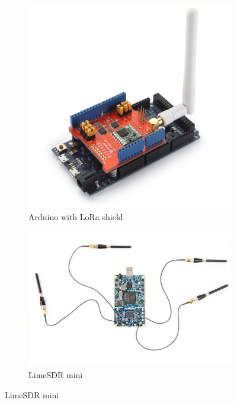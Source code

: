 \begin{figure}[H]
    \centering
    \begin{subfigure}[b]{0.25\textwidth}
     \includegraphics[width=1\textwidth]{figures/arduino.png}
     \caption{Arduino with LoRa shield}
     \label{fig:ard}
    \end{subfigure}%
    \hspace{2em}
    \begin{subfigure}[b]{0.25\textwidth}
     \includegraphics[width=1\textwidth]{figures/limesdr.png}
     \caption{LimeSDR mini}

\end{subfigure}
\end{figure}
